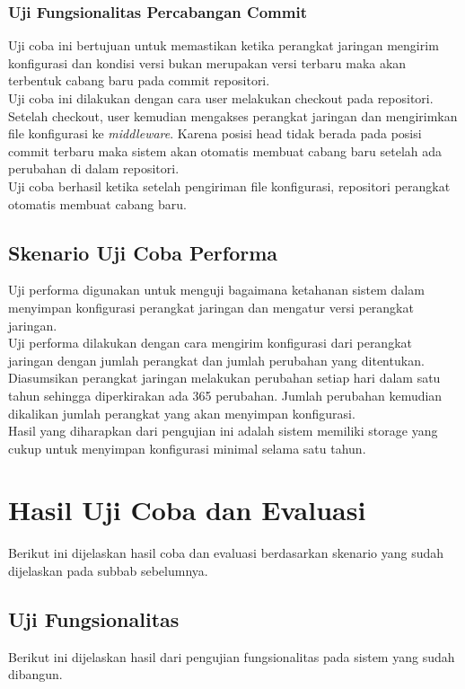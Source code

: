     	\subsubsection{Uji Fungsionalitas Percabangan Commit}
    	Uji coba ini bertujuan untuk memastikan ketika perangkat jaringan mengirim konfigurasi dan kondisi versi bukan merupakan versi terbaru maka akan terbentuk cabang baru pada commit repositori.\\
    	\indent Uji coba ini dilakukan dengan cara user melakukan checkout pada repositori. Setelah checkout, user kemudian mengakses perangkat jaringan dan mengirimkan file konfigurasi ke \textit{middleware}. Karena posisi head tidak berada pada posisi commit terbaru maka sistem akan otomatis membuat cabang baru setelah ada perubahan di dalam repositori.\\
    	\indent Uji coba berhasil ketika setelah pengiriman file konfigurasi, repositori perangkat otomatis membuat cabang baru.
    	 
    \subsection{Skenario Uji Coba Performa}
    	Uji performa digunakan untuk menguji bagaimana ketahanan sistem dalam menyimpan konfigurasi perangkat jaringan dan mengatur versi perangkat jaringan.\\
    	\indent Uji performa dilakukan dengan cara mengirim konfigurasi dari perangkat jaringan dengan jumlah perangkat dan jumlah perubahan yang ditentukan. Diasumsikan perangkat jaringan melakukan perubahan setiap hari dalam satu tahun sehingga diperkirakan ada 365 perubahan. Jumlah perubahan kemudian dikalikan jumlah perangkat yang akan menyimpan konfigurasi. \\
    	\indent Hasil yang diharapkan dari pengujian ini adalah sistem memiliki storage yang cukup untuk menyimpan konfigurasi minimal selama satu tahun. 
    
\section{Hasil Uji Coba dan Evaluasi}
	Berikut ini dijelaskan hasil coba dan evaluasi berdasarkan skenario yang sudah dijelaskan pada subbab sebelumnya.
	
	\subsection{Uji Fungsionalitas}
	Berikut ini dijelaskan hasil dari pengujian fungsionalitas pada sistem yang sudah dibangun.
	
